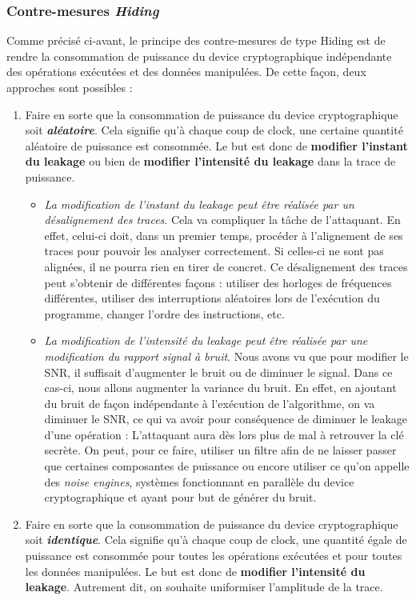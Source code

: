 \documentclass[10pt, oneside, a4paper]{article}
\begin{document}
\subsubsection{Contre-mesures \textit{Hiding}}
\label{sec:hiding}
\vspace{-0.1 cm}Comme précisé ci-avant, le principe des contre-mesures de type Hiding est de rendre la consommation de puissance du device cryptographique indépendante des opérations exécutées et des données manipulées. De cette façon, deux approches sont possibles :
\begin{enumerate}
\item Faire en sorte que la consommation de puissance du device cryptographique soit \textbf{\textit{aléatoire}}. Cela signifie qu'à chaque coup de clock, une certaine quantité aléatoire de puissance est consommée. Le but est donc de \textbf{modifier l'instant du leakage} ou bien de \textbf{modifier l'intensité du leakage} dans la trace de puissance.
\begin{itemize}
\item \textit{La modification de l'instant du leakage peut être réalisée par un désalignement des traces}. Cela va compliquer la tâche de l'attaquant. En effet, celui-ci doit, dans un premier temps, procéder à l'alignement de ses traces pour pouvoir les analyser correctement. Si celles-ci ne sont pas alignées, il ne pourra rien en tirer de concret. Ce désalignement des traces peut s’obtenir de différentes façons : utiliser des horloges de fréquences différentes, utiliser des interruptions aléatoires lors de l’exécution du programme, changer l’ordre des instructions, etc.
\item \textit{La modification de l'intensité du leakage peut être réalisée par une modification du rapport signal à bruit}. Nous avons vu que pour modifier le SNR, il suffisait d'augmenter le bruit ou de diminuer le signal. Dans ce cas-ci, nous allons augmenter la variance du bruit. En effet, en ajoutant du bruit de façon indépendante à l'exécution de l'algorithme, on va diminuer le SNR, ce qui va avoir pour conséquence de diminuer le leakage d'une opération : L'attaquant aura dès lors plus de mal à retrouver la clé secrète. On peut, pour ce faire, utiliser un filtre afin de ne laisser passer que certaines composantes de puissance ou encore utiliser ce qu'on appelle des \textit{noise engines}, systèmes fonctionnant en parallèle du device cryptographique et ayant pour but de générer du bruit.
\end{itemize}
\item Faire en sorte que la consommation de puissance du device cryptographique soit \textbf{\textit{identique}}. Cela signifie qu'à chaque coup de clock, une quantité égale de puissance est consommée pour toutes les opérations exécutées et pour toutes les données manipulées. Le but est donc de \textbf{modifier l'intensité du leakage}. Autrement dit, on souhaite uniformiser l'amplitude de la trace. 

\end{enumerate}
\end{document}
